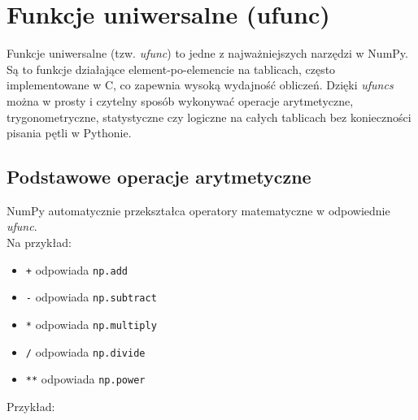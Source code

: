 \documentclass[
  letterpaper,
  DIV=11,
  numbers=noendperiod]{scrreprt}
\providecommand{\tightlist}{%
  \setlength{\itemsep}{0pt}\setlength{\parskip}{0pt}}\usepackage{longtable,booktabs,array}
\begin{document}
\chapter{Funkcje uniwersalne (ufunc)}\label{funkcje-uniwersalne-ufunc}

Funkcje uniwersalne (tzw. \emph{ufunc}) to jedne z najważniejszych
narzędzi w NumPy. Są to funkcje działające element-po-elemencie na
tablicach, często implementowane w C, co zapewnia wysoką wydajność
obliczeń. Dzięki \emph{ufuncs} można w prosty i czytelny sposób
wykonywać operacje arytmetyczne, trygonometryczne, statystyczne czy
logiczne na całych tablicach bez konieczności pisania pętli w Pythonie.

\section{Podstawowe operacje
arytmetyczne}\label{podstawowe-operacje-arytmetyczne}

NumPy automatycznie przekształca operatory matematyczne w odpowiednie
\emph{ufunc}.\\
Na przykład:

\begin{itemize}
\tightlist
\item
  \texttt{+} odpowiada \texttt{np.add}
\item
  \texttt{-} odpowiada \texttt{np.subtract}
\item
  \texttt{*} odpowiada \texttt{np.multiply}
\item
  \texttt{/} odpowiada \texttt{np.divide}
\item
  \texttt{**} odpowiada \texttt{np.power}
\end{itemize}

Przykład:
\end{document}
